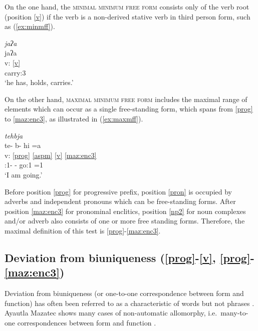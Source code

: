 \documentclass[output=paper]{langscibook}
\begin{document}
On the one hand, the \textsc{minimal minimum free form} consists only of the verb root (position \ref{v}) if the verb is a non-derived stative verb in third person form, such as (\ref{ex:minmff}).

\ea \label{ex:minmff} \textit{ja\2\st{}ʔa\2\3}\\
\glll {} ja\2ʔa\2\3\\
v: \ref{v}\\
{} carry:3\\
\glt `he has, holds, carries.'
\z

On the other hand, \textsc{maximal minimum free form} includes the maximal range of elements which can occur as a single free-standing form, which spans from \ref{prog} to \ref{maz:enc3}, as illustrated in (\ref{ex:maxmff}).

\ea \label{ex:maxmff} \textit{te\4\st{}hbja\2\3\1}\\
\glll {} te\2- b- hi\2\3 =a\1\\
v: \ref{prog} \ref{aspm} \ref{v} \ref{maz:enc3}\\
{} \Prog:1- \Hab- go:1 =1\Sg\\
\glt `I am going.'
\z

Before position \ref{prog} for progressive prefix, position \ref{pron} is occupied by adverbs and independent pronouns which can be free-standing forms. 
After position \ref{maz:enc3} for pronominal enclitics, position \ref{np2} for noun complexes and/or adverb also consists of one or more free standing forms. Therefore, the maximal definition of this test is \ref{prog}-\ref{maz:enc3}.

\subsection{Deviation from biuniqueness (\ref{prog}-\ref{v}, \ref{prog}-\ref{maz:enc3})}\label{sec:d:deviation}
Deviation from biuniqueness (or one-to-one correspondence between form and function) has often been referred to as a characteristic of words but not phrases \citep[cf.][54]{haspelmathword:2011}. Ayautla Mazatec shows many cases of non-automatic allomorphy, i.e.~many-to-one correspondences between form and function \citep[cf.][132]{pikek48}.
\end{document}
